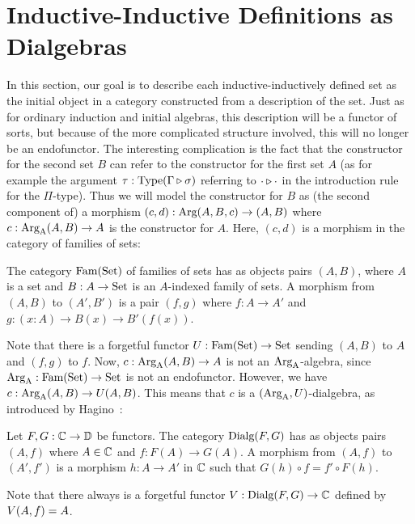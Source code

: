 \documentclass[orivec,envcountsame, ,envcountsect]{llncs}
\begin{document}

\section{Inductive-Inductive Definitions as Dialgebras}
\label{sec:indind-as-dialg}

In this section, our goal is to describe each inductive-inductively
defined set as the initial object in a category constructed from a
description of the set. Just as for ordinary induction and initial
algebras, this description will be a functor of sorts, but because of
the more complicated structure involved, this will no longer be an
endofunctor.
The interesting complication is the fact that the
constructor for the second set $B$ can refer to the constructor for
the first set $A$ (as for example the argument $\tau :
\text{Type}(\Gamma \triangleright \sigma)$ referring to
$\cdot \triangleright \cdot$ in the introduction rule for the
$\Pi$-type). 
Thus we will model the constructor for $B$ as (the second component
of) a morphism $(c, d) : \text{Arg}(A, B, c) \to (A, B)$ where $c :
\text{Arg}_{\text{A}}(A, B) \to A$ is the constructor for $A$. Here, $(c, d)$ is a
morphism in the category of families of sets:

\begin{definition}
  The category $\text{Fam}(\text{Set})$ of families of sets has as objects pairs $(A,
  B)$, where $A$ is a set and $B : A \to \text{Set}$ is an $A$-indexed family
  of sets. A morphism from $(A, B)$ to $(A', B')$ is a pair $(f, g)$
  where $f : A \to A'$ and ${g : (x : A) \to B(x) \to B'(f(x))}$.
\end{definition}
Note that there is a forgetful functor $U : \text{Fam}(\text{Set}) \to \text{Set}$
sending $(A, B)$ to $A$ and $(f, g)$ to $f$.
Now, $c : \text{Arg}_{\text{A}}(A, B) \to A$ is not an $\text{Arg}_{\text{A}}$-algebra,
since $\text{Arg}_{\text{A}} : \text{Fam}(\text{Set}) \to \text{Set}$ is not an endofunctor. However, we have $c :
\text{Arg}_{\text{A}}(A, B) \to U(A, B)$. This means that $c$ is a $(\text{Arg}_{\text{A}},
U)$-dialgebra, as introduced by Hagino~\cite{hagino1987phdthesis}:

\begin{definition}
  Let $F, G : \mathbb{C} \to \mathbb{D}$ be functors. The category $\text{Dialg}(F, G)$ has
  as objects pairs $(A, f)$ where $A \in \mathbb{C}$ and $f : F(A) \to
  G(A)$. A morphism from $(A, f)$ to $(A', f')$ is a morphism $h : A
  \to A'$ in $\mathbb{C}$ such that $G(h) \circ f = f' \circ F(h)$.
\end{definition}
Note that there always is a forgetful functor $V : \text{Dialg}(F, G) \to \mathbb{C}$
defined by $V(A, f) = A$.
\end{document}
